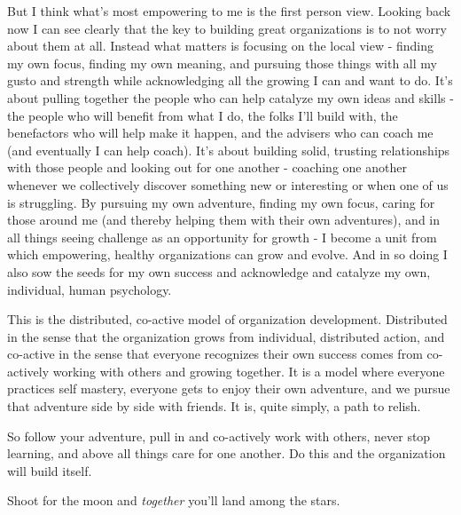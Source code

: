 \documentclass[11pt,a5paper]{book}
\begin{document}
But I think what's most empowering to me is the first person view. Looking back now I can see clearly that the key to building great organizations is to not worry about them at all. Instead what matters is focusing on the local view - finding my own focus, finding my own meaning, and pursuing those things with all my gusto and strength while acknowledging all the growing I can and want to do. It's about pulling together the people who can help catalyze my own ideas and skills - the people who will benefit from what I do, the folks I'll build with, the benefactors who will help make it happen, and the advisers who can coach me (and eventually I can help coach). It's about building solid, trusting relationships with those people and looking out for one another - coaching one another whenever we collectively discover something new or interesting or when one of us is struggling. By pursuing my own adventure, finding my own focus, caring for those around me (and thereby helping them with their own adventures), and in all things seeing challenge as an opportunity for growth - I become a unit from which empowering, healthy organizations can grow and evolve. And in so doing I also sow the seeds for my own success and acknowledge and catalyze my own, individual, human psychology. 
\newline

This is the distributed, co-active model of organization development. Distributed in the sense that the organization grows from individual, distributed action, and co-active in the sense that everyone recognizes their own success comes from co-actively working with others and growing together. It is a model where everyone practices self mastery, everyone gets to enjoy their own adventure, and we pursue that adventure side by side with friends. It is, quite simply, a path to relish.
\newline

So follow your adventure, pull in and co-actively work with others, never stop learning, and above all things care for one another. Do this and the organization will build itself.
\newline

Shoot for the moon and \textit{together} you'll land among the stars.



\end{document}
